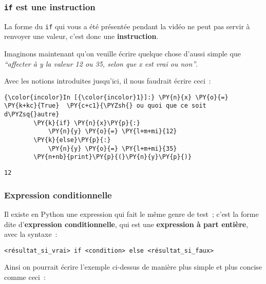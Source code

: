     \hypertarget{if-est-une-instruction}{%
\subsubsection{\texorpdfstring{\texttt{if} est une
instruction}{if est une instruction}}\label{if-est-une-instruction}}

    La forme du \texttt{if} qui vous a été présentée pendant la vidéo ne
peut pas servir à renvoyer une valeur, c'est donc une
\textbf{instruction}.

    Imaginons maintenant qu'on veuille écrire quelque chose d'aussi simple
que \emph{``affecter à y la valeur 12 ou 35, selon que x est vrai ou
non''}.

    Avec les notions introduites jusqu'ici, il nous faudrait écrire ceci~:

    \begin{Verbatim}[commandchars=\\\{\}]
{\color{incolor}In [{\color{incolor}1}]:} \PY{n}{x} \PY{o}{=} \PY{k+kc}{True}  \PY{c+c1}{\PYZsh{} ou quoi que ce soit d\PYZsq{}autre}
        \PY{k}{if} \PY{n}{x}\PY{p}{:}
            \PY{n}{y} \PY{o}{=} \PY{l+m+mi}{12}
        \PY{k}{else}\PY{p}{:}
            \PY{n}{y} \PY{o}{=} \PY{l+m+mi}{35}
        \PY{n+nb}{print}\PY{p}{(}\PY{n}{y}\PY{p}{)}
\end{Verbatim}


    \begin{Verbatim}[commandchars=\\\{\}]
12

    \end{Verbatim}

    \hypertarget{expression-conditionnelle}{%
\subsubsection{Expression
conditionnelle}\label{expression-conditionnelle}}

    Il existe en Python une expression qui fait le même genre de test~;
c'est la forme dite d'\textbf{expression conditionnelle}, qui est une
\textbf{expression à part entière}, avec la syntaxe~:

\begin{verbatim}
<résultat_si_vrai> if <condition> else <résultat_si_faux> 
\end{verbatim}

    Ainsi on pourrait écrire l'exemple ci-dessus de manière plus simple et
plus concise comme ceci~:

